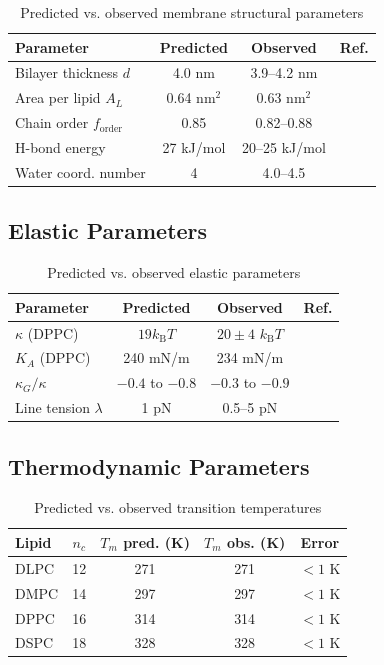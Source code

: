 \documentclass[twocolumn,10pt]{article}
\theoremstyle{remark}
\newcommand{\kB}{k_{\mathrm{B}}}
\begin{document}
\begin{table}[H]
\centering
\caption{Predicted vs. observed membrane structural parameters}
\begin{tabular}{lccc}
\toprule
Parameter & Predicted & Observed & Ref. \\
\midrule
Bilayer thickness $d$ & 4.0 nm & 3.9--4.2 nm & \cite{nagle2000} \\
Area per lipid $A_L$ & 0.64 nm$^2$ & 0.63 nm$^2$ & \cite{kucerka2011} \\
Chain order $f_{\text{order}}$ & 0.85 & 0.82--0.88 & \cite{seelig1974} \\
H-bond energy & 27 kJ/mol & 20--25 kJ/mol & \cite{suresh2000} \\
Water coord. number & 4 & 4.0--4.5 & \cite{stillinger1974} \\
\bottomrule
\end{tabular}
\end{table}

\subsection{Elastic Parameters}

\begin{table}[H]
\centering
\caption{Predicted vs. observed elastic parameters}
\begin{tabular}{lccc}
\toprule
Parameter & Predicted & Observed & Ref. \\
\midrule
$\kappa$ (DPPC) & $19\kB T$ & $20 \pm 4$ $\kB T$ & \cite{rawicz2000} \\
$K_A$ (DPPC) & 240 mN/m & 234 mN/m & \cite{rawicz2000} \\
$\kappa_G/\kappa$ & $-0.4$ to $-0.8$ & $-0.3$ to $-0.9$ & \cite{siegel2004} \\
Line tension $\lambda$ & 1 pN & 0.5--5 pN & \cite{baumgart2003} \\
\bottomrule
\end{tabular}
\end{table}

\subsection{Thermodynamic Parameters}

\begin{table}[H]
\centering
\caption{Predicted vs. observed transition temperatures}
\begin{tabular}{lcccc}
\toprule
Lipid & $n_c$ & $T_m$ pred. (K) & $T_m$ obs. (K) & Error \\
\midrule
DLPC & 12 & 271 & 271 & $<1$ K \\
DMPC & 14 & 297 & 297 & $<1$ K \\
DPPC & 16 & 314 & 314 & $<1$ K \\
DSPC & 18 & 328 & 328 & $<1$ K \\
\bottomrule
\end{tabular}
\end{table}
\end{document}
